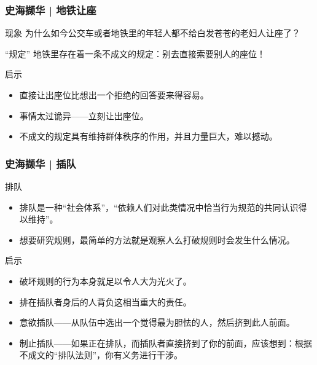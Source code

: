 \begin{frame}
  \frametitle{史海撷华 | 地铁让座}
  \begin{block}{现象}
    为什么如今公交车或者地铁里的年轻人都不给白发苍苍的老妇人让座了？
  \end{block}
  \pause
  \begin{block}{“规定”}
    地铁里存在着一条不成文的规定：别去直接索要别人的座位！
  \end{block}
  \pause
  \begin{block}{启示}
    \begin{itemize}
      \item 直接让出座位比想出一个拒绝的回答要来得容易。
      \item 事情太过诡异——立刻让出座位。
      \item 不成文的规定具有维持群体秩序的作用，并且力量巨大，难以撼动。
    \end{itemize}
  \end{block}
\end{frame}

\begin{frame}
  \frametitle{史海撷华 | 插队}
  \begin{block}{排队}
    \begin{itemize}
      \item 排队是一种“社会体系”，“依赖人们对此类情况中恰当行为规范的共同认识得以维持”。
      \item 想要研究规则，最简单的方法就是观察人么打破规则时会发生什么情况。
    \end{itemize}
  \end{block}
  \pause
  \begin{block}{启示}
    \begin{itemize}
      \item 破坏规则的行为本身就足以令人大为光火了。
      \item 排在插队者身后的人背负这相当重大的责任。
      \item 意欲插队——从队伍中选出一个觉得最为胆怯的人，然后挤到此人前面。
      \item 制止插队——如果正在排队，而插队者直接挤到了你的前面，应该想到：根据不成文的“排队法则”，你有义务进行干涉。
    \end{itemize}
  \end{block}
\end{frame}

